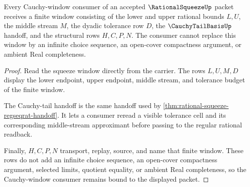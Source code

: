 \begin{theorem}
\label{thm:rational-squeeze-cauchy-window-consumer}
Every Cauchy-window consumer of an accepted $\RationalSqueezeUp$ packet receives a finite window consisting of the lower and upper rational bounds $L,U$, the middle stream $M$, the dyadic tolerance row $D$, the $\CauchyTailBasisUp$ handoff, and the structural rows $H,C,P,N$. The consumer cannot replace this window by an infinite choice sequence, an open-cover compactness argument, or ambient Real completeness.
\end{theorem}
\begin{proof}
Read the squeeze window directly from the carrier. The rows $L,U,M,D$ display the lower endpoint, upper endpoint, middle stream, and tolerance budget of the finite window.

The Cauchy-tail handoff is the same handoff used by \autoref{thm:rational-squeeze-regseqrat-handoff}. It lets a consumer reread a visible tolerance cell and its corresponding middle-stream approximant before passing to the regular rational readback.

Finally, $H,C,P,N$ transport, replay, source, and name that finite window. These rows do not add an infinite choice sequence, an open-cover compactness argument, selected limits, quotient equality, or ambient Real completeness, so the Cauchy-window consumer remains bound to the displayed packet.
\end{proof}


\begin{closurestatus}{\RationalSqueezeUp}
  \theoryclosure{\seedClosure}
  \formalstatus{\unformalizedV}
\end{closurestatus}
